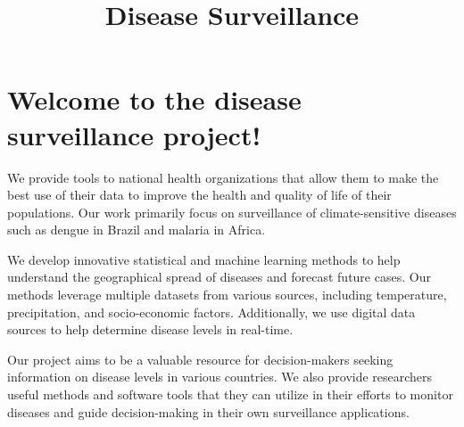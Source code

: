 \documentclass[
  letterpaper,
  DIV=11,
  numbers=noendperiod]{scrreprt}
\title{Disease Surveillance}
\author{}
\date{}
\renewcommand*\contentsname{Table of contents}
\newcommand\contentsname{Table of contents}
\begin{document}
\maketitle
\ifdefined\Shaded\renewenvironment{Shaded}{\begin{tcolorbox}[boxrule=0pt, sharp corners, interior hidden, enhanced, frame hidden, borderline west={3pt}{0pt}{shadecolor}, breakable]}{\end{tcolorbox}}\fi

\renewcommand*\contentsname{Table of contents}
{
\hypersetup{linkcolor=}
\setcounter{tocdepth}{2}
\tableofcontents
}

\hypertarget{welcome-to-the-disease-surveillance-project}{%
\chapter*{Welcome to the disease surveillance
project!}\label{welcome-to-the-disease-surveillance-project}}


We provide tools to national health organizations that allow them to
make the best use of their data to improve the health and quality of
life of their populations. Our work primarily focus on surveillance of
climate-sensitive diseases such as dengue in Brazil and malaria in
Africa.

We develop innovative statistical and machine learning methods to help
understand the geographical spread of diseases and forecast future
cases. Our methods leverage multiple datasets from various sources,
including temperature, precipitation, and socio-economic factors.
Additionally, we use digital data sources to help determine disease
levels in real-time.

Our project aims to be a valuable resource for decision-makers seeking
information on disease levels in various countries. We also provide
researchers useful methods and software tools that they can utilize in
their efforts to monitor diseases and guide decision-making in their own
surveillance applications.
\end{document}
